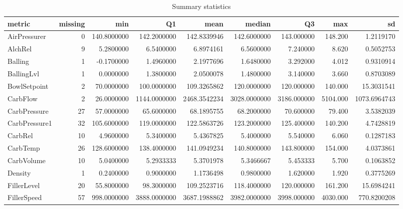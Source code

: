 \documentclass[]{report}
\begin{document}
\begin{table}[H]

\caption{\label{tab:unnamed-chunk-4}Summary statistics}
\centering
\fontsize{8}{10}\selectfont
\begin{tabular}[t]{lrrrrrrrr}
\toprule
\textbf{metric} & \textbf{missing} & \textbf{min} & \textbf{Q1} & \textbf{mean} & \textbf{median} & \textbf{Q3} & \textbf{max} & \textbf{sd}\\
\midrule
\rowcolor{gray!6}  AirPressurer & 0 & 140.8000000 & 142.2000000 & 142.8339946 & 142.6000000 & 143.000000 & 148.200 & 1.2119170\\
AlchRel & 9 & 5.2800000 & 6.5400000 & 6.8974161 & 6.5600000 & 7.240000 & 8.620 & 0.5052753\\
\rowcolor{gray!6}  Balling & 1 & -0.1700000 & 1.4960000 & 2.1977696 & 1.6480000 & 3.292000 & 4.012 & 0.9310914\\
BallingLvl & 1 & 0.0000000 & 1.3800000 & 2.0500078 & 1.4800000 & 3.140000 & 3.660 & 0.8703089\\
\rowcolor{gray!6}  BowlSetpoint & 2 & 70.0000000 & 100.0000000 & 109.3265862 & 120.0000000 & 120.000000 & 140.000 & 15.3031541\\
\addlinespace
CarbFlow & 2 & 26.0000000 & 1144.0000000 & 2468.3542234 & 3028.0000000 & 3186.000000 & 5104.000 & 1073.6964743\\
\rowcolor{gray!6}  CarbPressure & 27 & 57.0000000 & 65.6000000 & 68.1895755 & 68.2000000 & 70.600000 & 79.400 & 3.5382039\\
CarbPressure1 & 32 & 105.6000000 & 119.0000000 & 122.5863726 & 123.2000000 & 125.400000 & 140.200 & 4.7428819\\
\rowcolor{gray!6}  CarbRel & 10 & 4.9600000 & 5.3400000 & 5.4367825 & 5.4000000 & 5.540000 & 6.060 & 0.1287183\\
CarbTemp & 26 & 128.6000000 & 138.4000000 & 141.0949234 & 140.8000000 & 143.800000 & 154.000 & 4.0373861\\
\addlinespace
\rowcolor{gray!6}  CarbVolume & 10 & 5.0400000 & 5.2933333 & 5.3701978 & 5.3466667 & 5.453333 & 5.700 & 0.1063852\\
Density & 1 & 0.2400000 & 0.9000000 & 1.1736498 & 0.9800000 & 1.620000 & 1.920 & 0.3775269\\
\rowcolor{gray!6}  FillerLevel & 20 & 55.8000000 & 98.3000000 & 109.2523716 & 118.4000000 & 120.000000 & 161.200 & 15.6984241\\
FillerSpeed & 57 & 998.0000000 & 3888.0000000 & 3687.1988862 & 3982.0000000 & 3998.000000 & 4030.000 & 770.8200208\\

\end{tabular}
\end{table}
\end{document}
